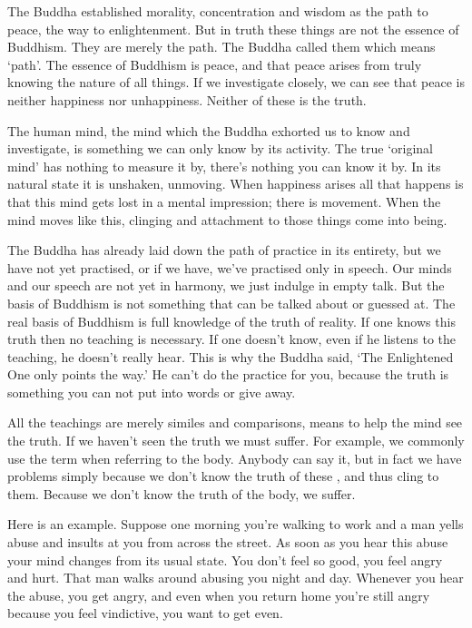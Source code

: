 The Buddha established morality, concentration and wisdom as the path to peace, the way to enlightenment. But in truth these things are not the essence of Buddhism. They are merely the path. The Buddha called them  which means `path'. The essence of Buddhism is peace, and that peace arises from truly knowing the nature of all things. If we investigate closely, we can see that peace is neither happiness nor unhappiness. Neither of these is the truth.

The human mind, the mind which the Buddha exhorted us to know and investigate, is something we can only know by its activity. The true `original mind' has nothing to measure it by, there's nothing you can know it by. In its natural state it is unshaken, unmoving. When happiness arises all that happens is that this mind gets lost in a mental impression; there is movement. When the mind moves like this, clinging and attachment to those things come into being.

The Buddha has already laid down the path of practice in its entirety, but we have not yet practised, or if we have, we've practised only in speech. Our minds and our speech are not yet in harmony, we just indulge in empty talk. But the basis of Buddhism is not something that can be talked about or guessed at. The real basis of Buddhism is full knowledge of the truth of reality. If one knows this truth then no teaching is necessary. If one doesn't know, even if he listens to the teaching, he doesn't really hear. This is why the Buddha said, `The Enlightened One only points the way.' He can't do the practice for you, because the truth is something you can not put into words or give away.

All the teachings are merely similes and comparisons, means to help the mind see the truth. If we haven't seen the truth we must suffer. For example, we commonly use the term  when referring to the body. Anybody can say it, but in fact we have problems simply because we don't know the truth of these , and thus cling to them. Because we don't know the truth of the body, we suffer.

Here is an example. Suppose one morning you're walking to work and a man yells abuse and insults at you from across the street. As soon as you hear this abuse your mind changes from its usual state. You don't feel so good, you feel angry and hurt. That man walks around abusing you night and day. Whenever you hear the abuse, you get angry, and even when you return home you're still angry because you feel vindictive, you want to get even.

